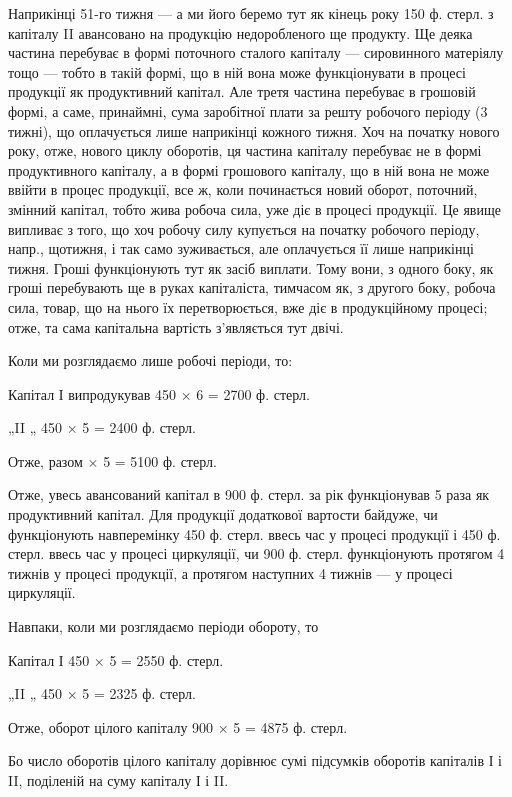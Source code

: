 Наприкінці 51-го тижня — а ми його беремо тут як кінець року
150 ф. стерл. з капіталу II авансовано на продукцію недоробленого ще
продукту. Ще деяка частина перебуває в формі поточного сталого капіталу
— сировинного матеріялу тощо — тобто в такій формі, що в ній
вона може функціонувати в процесі продукції як продуктивний капітал.
Але третя частина перебуває в грошовій формі, а саме, принаймні, сума
заробітної плати за решту робочого періоду (3 тижні), що оплачується
лише наприкінці кожного тижня. Хоч на початку нового року, отже, нового
циклу оборотів, ця частина капіталу перебуває не в формі продуктивного
капіталу, а в формі грошового капіталу, що в ній вона не може
ввійти в процес продукції, все ж, коли починається новий оборот, поточний,
змінний капітал, тобто жива робоча сила, уже діє в процесі продукції.
Це явище випливає з того, що хоч робочу силу купується на початку
робочого періоду, напр., щотижня, і так само зуживається, але
оплачується її лише наприкінці тижня. Гроші функціонують тут як засіб
виплати. Тому вони, з одного боку, як гроші перебувають ще в руках
капіталіста, тимчасом як, з другого боку, робоча сила, товар, що на
нього їх перетворюється, вже діє в продукційному процесі; отже, та сама
капітальна вартість з’являється тут двічі.

Коли ми розглядаємо лише робочі періоди, то:

Капітал І випродукував 450 × 6 = 2700 ф. стерл.

„II „ 450 × 5 = 2400 ф. стерл.

Отже, разом × 5 = 5100 ф. стерл.

Отже, увесь авансований капітал в 900 ф. стерл. за рік функціонував
5 раза як продуктивний капітал. Для продукції додаткової вартости
байдуже, чи функціонують навперемінку 450 ф. стерл. ввесь час у процесі
продукції і 450 ф. стерл. ввесь час у процесі циркуляції, чи 900 ф.
стерл. функціонують протягом 4 тижнів у процесі продукції, а протягом
наступних 4 тижнів — у процесі циркуляції.

Навпаки, коли ми розглядаємо періоди обороту, то

Капітал І 450 × 5 = 2550 ф. стерл.

„II „ 450 × 5 = 2325 ф. стерл.

Отже, оборот цілого капіталу 900 × 5 = 4875 ф. стерл.

Бо число оборотів цілого капіталу дорівнює сумі підсумків оборотів капіталів
І і II, поділеній на суму капіталу І і II.

